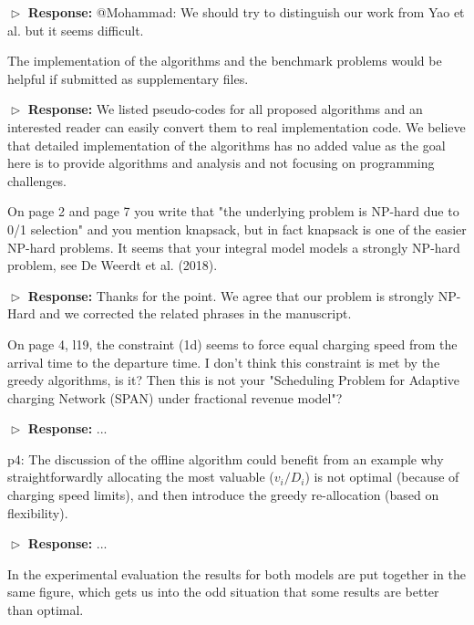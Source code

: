 \documentclass[11pt]{article}
\begin{document}
$\vartriangleright$ \noindent\textbf{Response:} 
{\color{red}@Mohammad: We should try to distinguish our work from Yao et al. but it seems difficult.}

\vspace{3mm}
{\color{blue} The implementation of the algorithms and the benchmark problems would be helpful if submitted as supplementary files. }
\vspace{3mm}

$\vartriangleright$ \noindent\textbf{Response:} 
We listed pseudo-codes for all proposed algorithms and an interested reader can easily convert them to real implementation code. We believe that detailed implementation of the algorithms has no added value as the goal here is to provide algorithms and analysis and not focusing on programming challenges.
  
\vspace{3mm}
{\color{blue} On page 2 and page 7 you write that "the underlying problem is NP-hard due to 0/1 selection" and you mention knapsack, but in fact knapsack is one of the easier NP-hard problems. It seems that your integral model models a strongly NP-hard problem, see De Weerdt et al. (2018). }
\vspace{3mm}

$\vartriangleright$ \noindent\textbf{Response:} 
Thanks for the point. We agree that our problem is strongly NP-Hard and we corrected the related phrases in the manuscript.

\vspace{3mm}
{\color{blue} On page 4, l19, the constraint (1d) seems to force equal charging speed from the arrival time to the departure time. I don't think this constraint is met by the greedy algorithms, is it? Then this is not your "Scheduling Problem for Adaptive charging Network (SPAN) under fractional revenue model"? }
\vspace{3mm}

$\vartriangleright$ \noindent\textbf{Response:} 
...

\vspace{3mm}
{\color{blue} p4: The discussion of the offline algorithm could benefit from an example why straightforwardly allocating the most valuable ($v_i/D_i$) is not optimal (because of charging speed limits), and then introduce the greedy re-allocation (based on flexibility). }
\vspace{3mm}

$\vartriangleright$ \noindent\textbf{Response:} 
...

\vspace{3mm}
{\color{blue} In the experimental evaluation the results for both models are put together in the same figure, which gets us into the odd situation that some results are better than optimal.
 }
\vspace{3mm}
\end{document}
